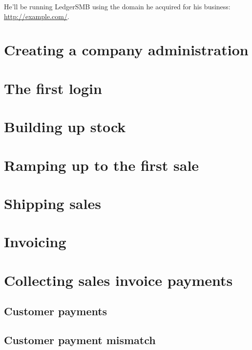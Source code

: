 He'll be running LedgerSMB using the domain he acquired for his business:
\url{http://example.com/}.

\chapter{Creating a company administration}
\label{cha:CompanyCreation}



\chapter{The first login}

\chapter{Building up stock}

\chapter{Ramping up to the first sale}


\chapter{Shipping sales}

\chapter{Invoicing}

\chapter{Collecting sales invoice payments}

\section{Customer payments}

\section{Customer payment mismatch}



